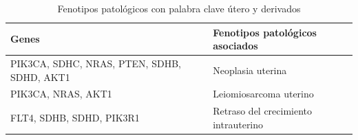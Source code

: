 \begin{table}[h]
	\centering
	\caption{Fenotipos patológicos con palabra clave útero y derivados}
	\begin{tabular}{|p{6cm}|p{6cm}|}
		\hline
		\textbf{Genes} & \textbf{Fenotipos patológicos asociados} \\
		\hline
		PIK3CA, SDHC, NRAS, PTEN, SDHB, SDHD, AKT1 & Neoplasia uterina \\
		\hline
		PIK3CA, NRAS, AKT1 & Leiomiosarcoma uterino \\
		\hline
		FLT4, SDHB, SDHD, PIK3R1 & Retraso del crecimiento intrauterino \\
		\hline
	\end{tabular}
	\label{palabra-clave-utero}
\end{table}
\clearpage
